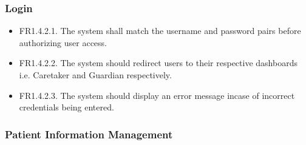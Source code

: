 \documentclass[12pt,a4paper]{article}
\begin{document}
\subsubsection{Login}
\begin{itemize}
    \item FR1.4.2.1. The system shall match the username and password pairs before authorizing user access.
    \item FR1.4.2.2. The system should redirect users to their respective dashboards i.e. Caretaker and Guardian respectively.
    \item FR1.4.2.3. The system should display an error message incase of incorrect credentials being entered.
\end{itemize}
\subsubsection{Patient Information Management}
\end{document}
